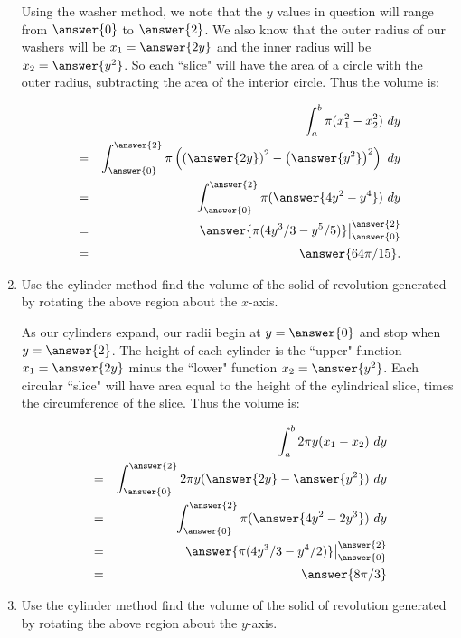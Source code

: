 \documentclass{ximera}
\begin{document}
\begin{question}
\begin{enumerate}
\begin{explanation}
Using the washer method, we note that the $y$ values in question will range from $\answer{0}$ to $\answer{2}$.  We also know that the outer radius of our washers will be $x_1=\answer{2y}$ and the inner radius will be $x_2=\answer{y^2}$.  So each ``slice" will have the area of a circle with the outer radius, subtracting the area of the interior circle.  Thus the volume is:

\begin{eqnarray*}
&&\int_a^b \pi(x_1^2-x_2^2)\ dy\\
&=&\int_{\answer{0}}^{\answer{2}} \pi\left(   \left( \answer{2y}\right)^2  - \left( \answer{y^2}\right)^2   \right)\ dy\\
&=&\int_{\answer{0}}^{\answer{2}} \pi(\answer{4y^2-y^4})\ dy\\
&=&\answer{\pi(4y^3/3-y^5/5)}\big|_{\answer{0}}^{\answer{2}}\\
&=&\answer{64\pi/15}.
\end{eqnarray*}
\end{explanation}



\item Use the cylinder method find the volume of the solid of revolution generated by rotating the above region about the $x$-axis.

\begin{explanation}
As our cylinders expand, our radii begin at $y=\answer{0}$ and stop when $y=\answer{2}$.  The height of each cylinder is the ``upper" function $x_1=\answer{2y}$ minus the ``lower" function $x_2=\answer{y^2}$.  Each circular ``slice" will have area equal to the height of the cylindrical slice, times the circumference of the slice.  Thus the volume is:

\begin{eqnarray*}
&&\int_a^b 2\pi y(x_1-x_2)\ dy\\
&=&\int_{\answer{0}}^{\answer{2}}2\pi y(\answer{2y}-\answer{y^2})\ dy\\
&=&\int_{\answer{0}}^{\answer{2}}\pi (\answer{4y^2-2y^3})\ dy\\
&=&\answer{\pi(4y^3/3-y^4/2)}\big|_{\answer{0}}^{\answer{2}}\\
&=&\answer{8\pi/3}
\end{eqnarray*}


\end{explanation}


\item Use the cylinder method find the volume of the solid of revolution generated by rotating the above region about the $y$-axis.


\end{enumerate}
\end{question}
\end{document}
